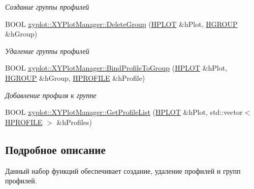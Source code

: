 \begin{DoxyCompactItemize}
\begin{DoxyCompactList}\small\item\em Создание группы профилей \end{DoxyCompactList}\item 
B\-O\-O\-L \hyperlink{group__gr_output_gae089459d5fab87f702abe1ac196906dc}{xyplot\-::\-X\-Y\-Plot\-Manager\-::\-Delete\-Group} (\hyperlink{classxyplot_1_1_h_p_l_o_t}{H\-P\-L\-O\-T} \&h\-Plot, \hyperlink{classxyplot_1_1_h_g_r_o_u_p}{H\-G\-R\-O\-U\-P} \&h\-Group)
\begin{DoxyCompactList}\small\item\em Удаление группы профилей \end{DoxyCompactList}\item 
B\-O\-O\-L \hyperlink{group__gr_output_ga8e52043c4085813433a831d07687ebc9}{xyplot\-::\-X\-Y\-Plot\-Manager\-::\-Bind\-Profile\-To\-Group} (\hyperlink{classxyplot_1_1_h_p_l_o_t}{H\-P\-L\-O\-T} \&h\-Plot, \hyperlink{classxyplot_1_1_h_g_r_o_u_p}{H\-G\-R\-O\-U\-P} \&h\-Group, \hyperlink{classxyplot_1_1_h_p_r_o_f_i_l_e}{H\-P\-R\-O\-F\-I\-L\-E} \&h\-Profile)
\begin{DoxyCompactList}\small\item\em Добавление профиля к группе \end{DoxyCompactList}\item 
B\-O\-O\-L \hyperlink{group__gr_output_gab01278bbb9ea9612d30f3cbe4c7805df}{xyplot\-::\-X\-Y\-Plot\-Manager\-::\-Get\-Profile\-List} (\hyperlink{classxyplot_1_1_h_p_l_o_t}{H\-P\-L\-O\-T} \&h\-Plot, std\-::vector$<$ \hyperlink{classxyplot_1_1_h_p_r_o_f_i_l_e}{H\-P\-R\-O\-F\-I\-L\-E} $>$ \&h\-Profiles)
\end{DoxyCompactItemize}


\subsection{Подробное описание}
Данный набор функций обеспечивает создание, удаление профилей и групп профилей. 

